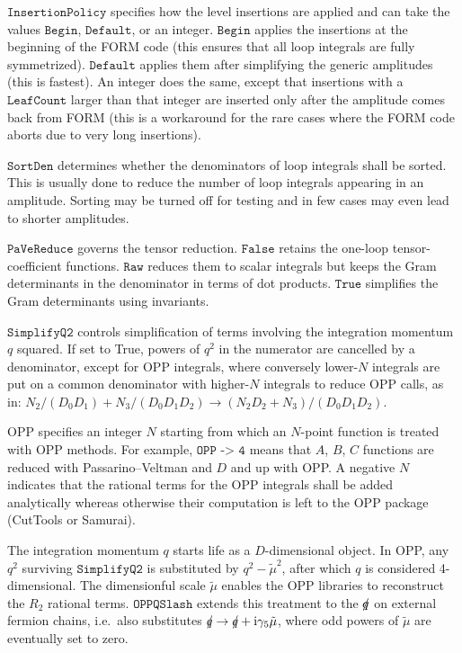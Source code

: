 \documentclass[twoside,11pt]{article}
\def\Code#1{\ensuremath{\texttt{#1}}}
\def\ie{i.e.\ }
\def\ri{\mathrm{i}}
\def\qslash{\rlap{/}q}
\begin{document}
%
%
%
\Code{InsertionPolicy} specifies how the level insertions are applied
and can take the values \Code{Begin}, \Code{Default}, or an integer. 
\Code{Begin} applies the insertions at the beginning of the FORM code
(this ensures that all loop integrals are fully symmetrized).  
\Code{Default} applies them after simplifying the generic amplitudes
(this is fastest).  An integer does the same, except that insertions
with a \Code{LeafCount} larger than that integer are inserted only 
after the amplitude comes back from FORM (this is a workaround for
the rare cases where the FORM code aborts due to very long insertions).

\Code{SortDen} determines whether the denominators of loop integrals
shall be sorted.  This is usually done to reduce the number of loop
integrals appearing in an amplitude.  Sorting may be turned off for
testing and in few cases may even lead to shorter amplitudes.

\Code{PaVeReduce} governs the tensor reduction.  \Code{False} retains
the one-loop tensor-coefficient functions.  \Code{Raw} reduces them
to scalar integrals but keeps the Gram determinants in the denominator
in terms of dot products.  \Code{True} simplifies the Gram determinants
using invariants.

\Code{SimplifyQ2} controls simplification of terms involving the
integration momentum $q$ squared.  If set to True, powers of $q^2$ in 
the numerator are cancelled by a denominator, except for OPP integrals,
where conversely lower-$N$ integrals are put on a common denominator
with higher-$N$ integrals to reduce OPP calls, as in:
$N_2/(D_0 D_1) + N_3/(D_0 D_1 D_2) \to (N_2 D_2 + N_3)/(D_0 D_1 D_2)$.

%
%
%
%
%
%
OPP specifies an integer $N$ starting from which an $N$-point function is 
treated with OPP methods.  For example, \Code{OPP -> 4} means that $A$, 
$B$, $C$ functions are reduced with Passarino--Veltman and $D$ and up with 
OPP.  A negative $N$ indicates that the rational terms for the OPP 
integrals shall be added analytically whereas otherwise their computation 
is left to the OPP package (CutTools or Samurai).

The integration momentum $q$ starts life as a $D$-dimensional object.  
In OPP, any $q^2$ surviving \Code{SimplifyQ2} is substituted by $q^2 - 
\tilde\mu^2$, after which $q$ is considered 4-dimensional.  The 
dimensionful scale $\tilde\mu$ enables the OPP libraries to reconstruct 
the $R_2$ rational terms.  \Code{OPPQSlash} extends this treatment to 
the $\qslash$ on external fermion chains, \ie also substitutes 
$\qslash\to \qslash + \ri\gamma_5\tilde\mu$, where odd powers of 
$\tilde\mu$ are eventually set to zero.
\end{document}
